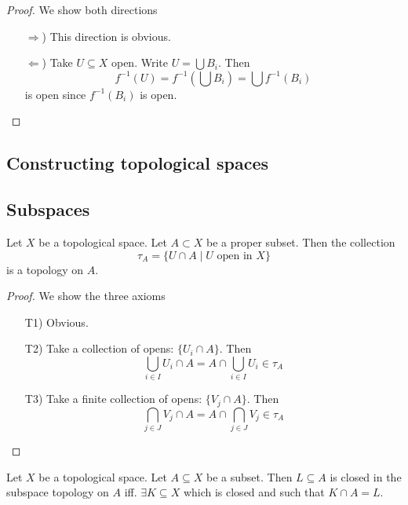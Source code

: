 \begin{proof}
  We show both directions
  \begin{enumerate}
    \item[\( \Rightarrow \))]
      This direction is obvious.
    \item[\( \Leftarrow \))]
      Take \( U \subseteq X \) open. Write \( U = \bigcup B_i \).
      Then
      \[
        {f}^{-1} (U) = {f}^{-1} \left(\bigcup B_i\right) = \bigcup {f}^{-1} \left(B_i\right)
      \]
      is open since \( {f}^{-1} (B_i) \) is open.
  \end{enumerate}
\end{proof}

\subsection{Constructing topological spaces}

\subsection{Subspaces}

\begin{proposition}
  Let \( X \) be a topological space.
  Let \( A \subset X \) be a proper subset.
  Then the collection
  \[
    \tau_A = \{U \cap A \mid U \text{ open in } X\}
  \]
  is a topology on \( A \).
\end{proposition}

\begin{proof}
  We show the three axioms
  \begin{enumerate}
    \item[T1)]
      Obvious.
    \item[T2)]
      Take a collection of opens: \( \{ U_i \cap A \}  \). Then
      \[
        \bigcup_{i\in I} U_i \cap A = A \cap  \bigcup_{i\in I} U_i \in \tau_A
      \]
    \item[T3)]
      Take a finite collection of opens: \( \{ V_j \cap A \}  \). Then
      \[
        \bigcap_{j\in J} V_j \cap A = A \cap  \bigcap_{j\in J} V_j \in \tau_A
      \]
  \end{enumerate}
\end{proof}

\begin{proposition}
  Let \( X \) be a topological space.
  Let \( A \subseteq X \) be a subset.
  Then \( L \subseteq A \) is closed in the subspace topology
  on \( A \) iff. \( \exists K \subseteq X \) which is closed
  and such that \( K \cap A = L \).
\end{proposition}

